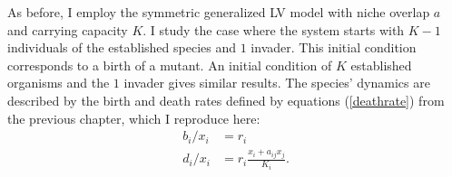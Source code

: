 As before, I employ the symmetric generalized LV model with niche overlap $a$ and carrying capacity $K$. 
I study the case where the system starts with $K-1$ individuals of the established species and $1$ invader. 
This initial condition corresponds to a birth of a mutant. 
An initial condition of $K$ established organisms and the $1$ invader gives similar results. 
The species' dynamics are described by the birth and death rates defined by equations (\ref{deathrate}) from the previous chapter, which I reproduce here:
\begin{align*}
	b_i/x_i &= r_i \\
	d_i/x_i &= r_i\frac{x_i+a_{ij}x_j}{K_i}. 
\end{align*}

